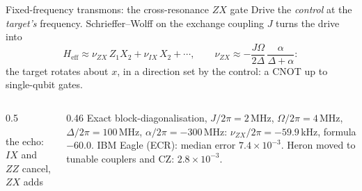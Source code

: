 \documentclass[aspectratio=169,11pt]{beamer}
\begin{document}
\begin{frame}{Fixed-frequency transmons: the cross-resonance $ZX$ gate}
  Drive the \emph{control} at the \emph{target's} frequency. Schrieffer--Wolff on the exchange coupling $J$ turns the drive into
  \[ H_{\mathrm{eff}}\approx\nu_{ZX}\,Z_1X_2+\nu_{IX}\,X_2+\cdots,\qquad
     \nu_{ZX}\approx-\frac{J\Omega}{2\Delta}\,\frac{\alpha}{\Delta+\alpha} : \]
  the target rotates about $x$, in a direction set by the control: a CNOT up to single-qubit gates.
  \vskip2mm
  \begin{columns}[c]
    \begin{column}{0.5\textwidth}
      \centering
      \par
      {\small the echo: $IX$ and $ZZ$ cancel, $ZX$ adds}
    \end{column}
    \begin{column}{0.46\textwidth}
      {\small Exact block-diagonalisation, $J/2\pi=2$\,MHz, $\Omega/2\pi=4$\,MHz, $\Delta/2\pi=100$\,MHz, $\alpha/2\pi=-300$\,MHz: $\nu_{ZX}/2\pi=-59.9$\,kHz, formula $-60.0$.}
      \vskip2mm
      IBM Eagle (ECR): median error $7.4\times10^{-3}$. Heron moved to tunable couplers and CZ: $2.8\times10^{-3}$.
    \end{column}
  \end{columns}
\end{frame}
\end{document}
